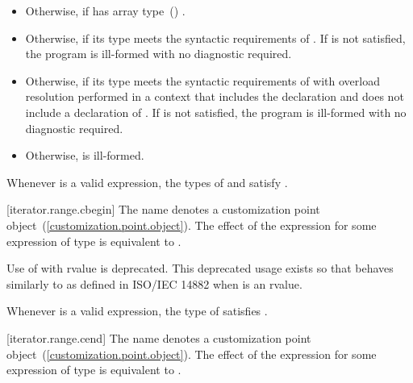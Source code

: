 {\begin{itemize}
\item
  Otherwise,  if  has array
  type~() .

\item
  Otherwise,  if its type  meets the
  syntactic requirements of
  . If
   is not satisfied, the program is ill-formed with
  no diagnostic required.

\item
  Otherwise,  if its type  meets the
  syntactic requirements of
   with overload
  resolution performed in a context that includes the declaration
   and does not include
  a declaration of . If  is not
  satisfied, the program is ill-formed with no diagnostic required.

\item
  Otherwise,  is ill-formed.
\end{itemize}

\pnum
\remark Whenever  is a valid expression, the
types of  and  satisfy
.

[iterator.range.cbegin]{}
\pnum
The name  denotes a customization point
object~(\ref{customization.point.object}). The effect of the expression
 for some expression  of type 
is equivalent to .

\pnum
Use of  with rvalue  is deprecated.
\enternote This deprecated usage exists so that 
behaves similarly to  as defined in ISO/IEC 14882 when
 is an rvalue. \exitnote

\pnum
\enternote Whenever  is a valid expression, the
type of  satisfies . \exitnote

[iterator.range.cend]{}
\pnum
The name  denotes a customization point
object~(\ref{customization.point.object}). The effect of the expression
 for some expression  of type 
is equivalent to .

}
